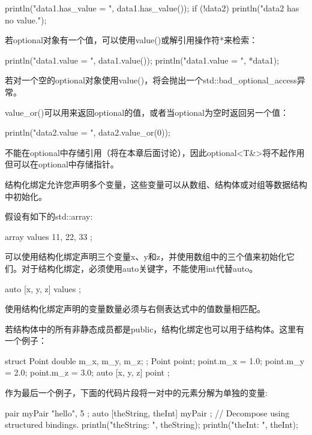 \begin{cpp}
println("data1.has_value = {}", data1.has_value());
if (!data2) {
    println("data2 has no value.");
}
\end{cpp}

若optional对象有一个值，可以使用value()或解引用操作符*来检索：

\begin{cpp}
println("data1.value = {}", data1.value());
println("data1.value = {}", *data1);
\end{cpp}

若对一个空的optional对象使用value()，将会抛出一个std::bad\_optional\_access异常。

value\_or()可以用来返回optional的值，或者当optional为空时返回另一个值：

\begin{cpp}
println("data2.value = {}", data2.value_or(0));
\end{cpp}

不能在optional中存储引用（将在本章后面讨论），因此optional<T\&>将不起作用但可以在optional中存储指针。


结构化绑定允许您声明多个变量，这些变量可以从数组、结构体或对组等数据结构中初始化。

假设有如下的std::array:

\begin{cpp}
array values { 11, 22, 33 };
\end{cpp}

可以使用结构化绑定声明三个变量x、y和z，并使用数组中的三个值来初始化它们。对于结构化绑定，必须使用auto关键字，不能使用int代替auto。

\begin{cpp}
auto [x, y, z] { values };
\end{cpp}

使用结构化绑定声明的变量数量必须与右侧表达式中的值数量相匹配。

若结构体中的所有非静态成员都是public，结构化绑定也可以用于结构体。这里有一个例子：

\begin{cpp}
struct Point { double m_x, m_y, m_z; };
Point point;
point.m_x = 1.0; point.m_y = 2.0; point.m_z = 3.0;
auto [x, y, z] { point };
\end{cpp}

作为最后一个例子，下面的代码片段将一对中的元素分解为单独的变量:

\begin{cpp}
pair myPair { "hello", 5 };
auto [theString, theInt] { myPair }; // Decompose using structured bindings.
println("theString: {}", theString);
println("theInt: {}", theInt);
\end{cpp}

